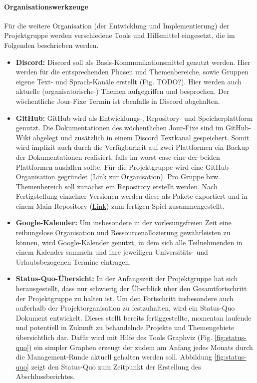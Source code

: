 \paragraph{Organisationswerkzeuge}
Für die weitere Organisation (der Entwicklung und Implementierung) der Projektgruppe werden verschiedene Tools und Hilfsmittel eingesetzt, die im Folgenden beschrieben werden.

\begin{itemize}
	\item \textbf{Discord: } Discord soll als Basis-Kommunikationsmittel genutzt werden. Hier werden für die entsprechenden Phasen und Themenbereiche, sowie Gruppen eigene Text- und Sprach-Kanäle erstellt (Fig. TODO?). Hier werden auch aktuelle (organisatorische-) Themen aufgegriffen und besprochen. Der wöchentliche Jour-Fixe Termin ist ebenfalls in Discord abgehalten.
	\item \textbf{GitHub: } GitHub wird als Entwicklungs-, Repository- und Speicherplattform genutzt. Die Dokumentationen des wöchentlichen Jour-Fixe sind im GitHub-Wiki abgelegt und zusätzlich in einem Discord Textkanal gespeichert. Somit wird implizit auch durch die Verfügbarkeit auf zwei Plattformen ein Backup der Dokumentationen realisiert, falls im worst-case eine der beiden Plattformen ausfallen sollte. Für die Projektgruppe wird eine GitHub-Organisation gegründet (\href{https://github.com/PG649-3D-RPG}{Link zur Organisation}). Pro Gruppe bzw. Themenbereich soll zunächst ein Repository erstellt werden. Nach Fertigstellung einzelner Versionen werden diese als Pakete exportiert und in einem Main-Repository (\href{}{Link}) zum fertigen Spiel zusammengestellt.
	\item \textbf{Google-Kalender: } Um insbesondere in der vorlesungsfreien Zeit eine reibungslose Organisation und Ressourcenallozierung gewährleisten zu können, wird Google-Kalender genutzt, in dem sich alle Teilnehmenden in einem Kalender sammeln und ihre jeweiligen Universitäts- und Urlaubsbezogenen Termine eintragen.
	\item \textbf{Status-Quo-Übersicht: } In der Anfangszeit der Projektgruppe hat sich herausgestellt, dass nur schwierig der Überblick über den Gesamtfortschritt der Projektgruppe zu halten ist. Um den Fortschritt insbesondere auch außerhalb der Projektorganisation zu festzuhalten, wird ein Status-Quo Dokument entwickelt. Dieses stellt bereits fertiggestellte, momentan laufende und potentiell in Zukunft zu behandelnde Projekte und Themengebiete übersichtlich dar. Dafür wird mit Hilfe des Tools Graphviz (Fig. \ref{fig:status-quo}) ein simpler Graphen erzeugt der zudem am Anfang jedes Monats durch die Management-Runde aktuell gehalten werden soll. Abbildung \ref{fig:status-quo} zeigt den Status-Quo zum Zeitpunkt der Erstellung des Abschlussberichtes.

\end{itemize}
